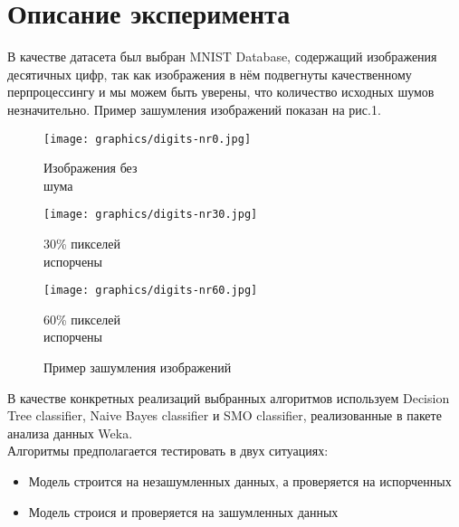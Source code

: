 \documentclass{article}
\begin{document}
\section{Описание эксперимента}
В качестве датасета был выбран MNIST Database, содержащий изображения десятичных цифр, так как изображения в нём подвегнуты качественному перпроцессингу и мы можем быть уверены, что количество исходных шумов незначительно. Пример зашумления изображений показан на рис.1.

\begin{figure}[ht]
\centering
\begin{minipage}{.3\textwidth}
	\texttt{[image: graphics/digits-nr0.jpg]}
	\captionsetup{justification=centering}
	\caption*{Изображения без\\ шума}
\end{minipage}
\begin{minipage}{.3\textwidth}
	\texttt{[image: graphics/digits-nr30.jpg]}
	\captionsetup{justification=centering}
	\caption*{ 30\% пикселей\\ испорчены}
\end{minipage}
\begin{minipage}{.3\textwidth}
	\texttt{[image: graphics/digits-nr60.jpg]}
	\captionsetup{justification=centering}
	\caption*{ 60\% пикселей\\ испорчены}
\end{minipage}
\caption{Пример зашумления изображений}
\end{figure}

В качестве конкретных реализаций выбранных алгоритмов используем Decision Tree classifier, Naive Bayes classifier и SMO classifier, реализованные в пакете анализа данных Weka.
\\Алгоритмы предполагается тестировать в двух ситуациях:
\begin{itemize}
\item Модель строится на незашумленных данных, а проверяется на испорченных
\item Модель строися и проверяется на зашумленных данных
\end{itemize}
\end{document}
